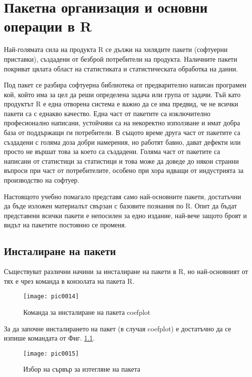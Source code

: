 \newpage
\chapter{Пакетна организация и основни операции в R}
\label{chapter02}

Най-голямата сила на продукта R се дължи на хилядите пакети (софтуерни приставки), създадени от безброй потребители на продукта. Наличните пакети покриват цялата област на статистиката и статистическата обработка на данни. 

Под пакет се разбира софтуерна библиотека от предварително написан програмен кой, който има за цел да реши определена задача или група от задачи. Тъй като продуктът R е една отворена система е важно да се има предвид, че не всички пакети са с еднакво качество. Една част от пакетите са изключително професионално написани, устойчиви са на некоректно използване и имат добра база от поддържащи ги потребители. В същото време друга част от пакетите са създадени с голяма доза добри намерения, но работят бавно, дават дефекти или просто не вършат това за което са създадени. Голяма част от пакетите са написани от статистици за статистици и това може да доведе до някои странни въпроси при част от потребителите, особено при хора идващи от индустрията за производство на софтуер. 

Настоящото учебно помагало представя само най-основните пакети, достатъчни да бъде изложен материалът свързан с базовите познания по R. Опит да бъдат представени всички пакети е непосилен за едно издание, най-вече защото броят и видът на пакетите постоянно се променя. 

\section{Инсталиране на пакети}

Съществуват различни начини за инсталиране на пакети в R, но най-основният от тях е чрез команда в конзолата на пакета R. 

\begin{figure}[h!]
  \centering
  \texttt{[image: pic0014]}
  \caption{Команда за инсталиране на пакета coefplot}
\label{figure0014}
\end{figure}
\FloatBarrier

За да започне инсталирането на пакет (в случая coefplot) е достатъчно да се изпише командата от Фиг. \ref{figure0014}.

\begin{figure}[h!]
  \centering
  \texttt{[image: pic0015]}
  \caption{Избор на сървър за изтегляне на пакета}
\label{figure0015}
\end{figure}
\FloatBarrier

